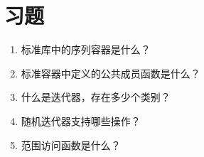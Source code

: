 \section{习题}
\begin{enumerate}
\item
标准库中的序列容器是什么？

\item
标准容器中定义的公共成员函数是什么？

\item
什么是迭代器，存在多少个类别？

\item
随机迭代器支持哪些操作？

\item
范围访问函数是什么？
\end{enumerate}
